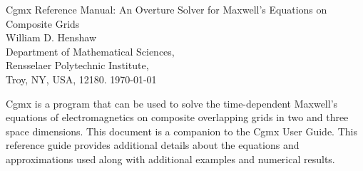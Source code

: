 \documentclass{article}
\begin{document}


\def\ud     {{    U}}
\def\pd     {{    P}}

\newcommand{\mbar}{\bar{m}}
\newcommand{\Rbar}{\bar{R}}
\newcommand{\Ru}{R_u}         %
\newcommand{\Div}{\grad\cdot}
\newcommand{\tauv}{\boldsymbol{\tau}}
\newcommand{\sumi}{\sum_{i=1}^n}
\newcommand{\dt}{{\Delta t}}
\newcommand{\dx}{{\Delta x}}
\newcommand{\eps}{\epsilon}

\newcommand{\Ic}{{\mathcal I}}
\newcommand{\Lc}{{\mathcal L}}
\newcommand{\Oc}{{\mathcal O}}

\baselineskip
\begin{flushleft}
{\Large
Cgmx Reference Manual: An {Overture} Solver for {Maxwell}'s Equations on Composite Grids\\
}
\vspace{2\baselineskip}
William D. Henshaw  \\
Department of Mathematical Sciences, \\
Rensselaer Polytechnic Institute, \\
Troy, NY, USA, 12180.
\vspace{\baselineskip}
\today\\
\vspace{\baselineskip}

\vspace{4\baselineskip}


Cgmx is a program that can be used to solve the time-dependent Maxwell's equations
of electromagnetics on composite overlapping grids in two and three space
dimensions. This document is a companion to the Cgmx User Guide. 
This reference guide provides additional details about the equations and approximations used along
with additional examples and numerical results.

\end{flushleft}
\end{document}

